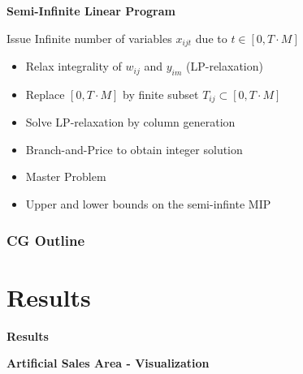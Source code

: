 \begin{frame}{\textbf{Semi-Infinite Linear Program}}
\begin{block}{Issue}
Infinite number of variables $x_{ijt}$ due to $t \in \left[ 0,T \cdot M \right]$
\end{block}
\bigskip
{}
\begin{itemize}
  \item<2-> Relax integrality of $w_{ij}$ and $y_{im}$ (LP-relaxation)
  \item<3-> Replace $[0,T \cdot M]$ by finite subset $T_{ij} \subset [0,T \cdot M]$  
	\item<4-> Solve LP-relaxation by column generation
	\item<5-> Branch-and-Price to obtain integer solution
\end{itemize}
\vfill
{}
\begin{itemize}
  \item<2->  Master Problem
  \item<5-> Upper and lower bounds on the semi-infinte MIP
\end{itemize}
\end{frame}

\begin{frame}
\frametitle{CG Outline}
\begin{center}
\scalebox{0.55}{

}
\end{center}
\end{frame}

\section{Results}
\begin{frame}
\begin{center}
{\LARGE \textbf{Results}}
\end{center}
\end{frame}


\begin{frame}{\textbf{Artificial Sales Area - Visualization}}
\begin{center}
    
\end{center}
\end{frame}

